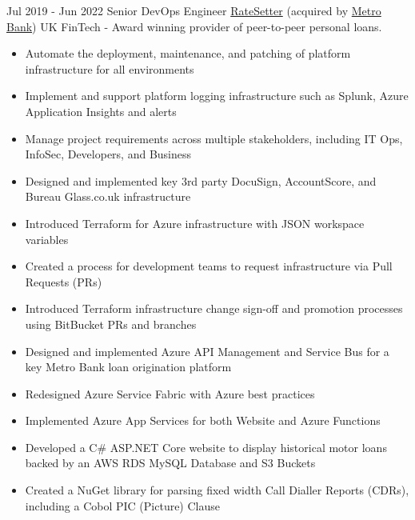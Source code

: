 \begin{twenty}
\twentyitem
  {Jul 2019 - Jun 2022}
  {Senior DevOps Engineer}
  {{\href{https://www.ratesetter.com/}{RateSetter}}}
  {(acquired by {\href{https://metrobankonline.co.uk}{Metro Bank}})}
  {UK}
  {FinTech - Award winning provider of peer-to-peer personal loans.}
  {\begin{itemize}
    \item Automate the deployment, maintenance, and patching of platform infrastructure for all environments
    \item Implement and support platform logging infrastructure such as Splunk, Azure Application Insights and alerts
    \item Manage project requirements across multiple stakeholders, including IT Ops, InfoSec, Developers, and Business
  \end{itemize}}
  {\begin{itemize}
    \item Designed and implemented key 3rd party DocuSign, AccountScore, and Bureau Glass.co.uk infrastructure
    \item Introduced Terraform for Azure infrastructure with JSON workspace variables
    \item Created a process for development teams to request infrastructure via Pull Requests (PRs)
    \item Introduced Terraform infrastructure change sign-off and promotion processes using BitBucket PRs and branches
    \item Designed and implemented Azure API Management and Service Bus for a key Metro Bank loan origination platform
    \item Redesigned Azure Service Fabric with Azure best practices
    \item Implemented Azure App Services for both Website and Azure Functions
    \item Developed a C\# ASP.NET Core website to display historical motor loans backed by an AWS RDS MySQL Database and S3 Buckets
    \item Created a NuGet library for parsing fixed width Call Dialler Reports (CDRs), including a Cobol PIC (Picture) Clause
  \end{itemize}}
\end{twenty}
